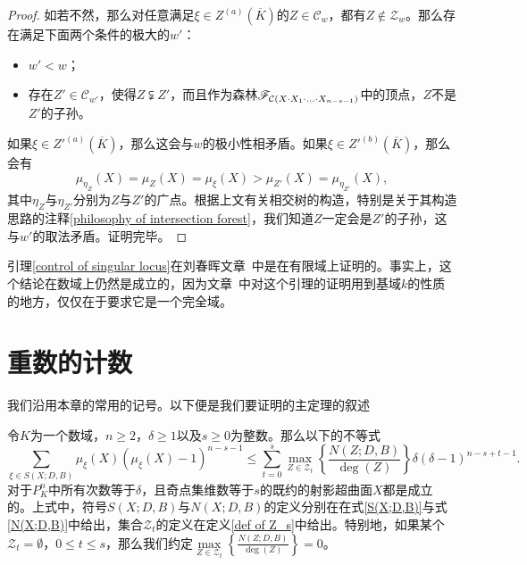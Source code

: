 \begin{proof}
如若不然，那么对任意满足$\xi\in Z^{(a)}(\overline{K})$的$Z\in \mathcal{C}_w$，都有$Z\not\in \mathcal{Z}_w$。那么存在满足下面两个条件的极大的$w'$：
\begin{itemize}
\item $w' < w$；
\item 存在$Z' \in \mathcal{C}_{w'}$，使得$Z\subsetneqq Z'$，而且作为森林$\mathscr{F}_{\mathcal C(X\cdot X_{1}\cdot\ldots\cdot X_{n-s-1})}$中的顶点，$Z$不是$Z'$的子孙。
\end{itemize}
如果$\xi\in Z'^{(a)}(\overline{K})$，那么这会与$w$的极小性相矛盾。如果$\xi\in Z'^{(b)}(\overline{K})$，那么会有
\begin{equation}
\mu_{\eta_Z}(X) = \mu_Z(X) = \mu_{\xi}(X) > \mu_{Z'}(X) = \mu_{\eta_{Z'}}(X),
\end{equation}
其中$\eta_Z$与$\eta_{Z'}$分别为$Z$与$Z'$的广点。根据上文有关相交树的构造，特别是关于其构造思路的注释\ref{philosophy of intersection forest}，我们知道$Z$一定会是$Z'$的子孙，这与$w'$的取法矛盾。证明完毕。
\end{proof}

\begin{remark}
引理\ref{control of singular locus}在刘春晖文章~中是在有限域上证明的。事实上，这个结论在数域上仍然是成立的，因为文章~中对这个引理的证明用到基域$k$的性质的地方，仅仅在于要求它是一个完全域。
\end{remark}

\section{重数的计数}
\label{counting multiplicity}
我们沿用本章的常用的记号。以下便是我们要证明的主定理的叙述

\begin{theorem} \label{main theorem}
令$K$为一个数域，$n \geqslant 2$，$\delta \geqslant 1$以及$s \geqslant 0$为整数。那么以下的不等式
\begin{equation} \label{estimate in main theorem}
\sum_{\xi\in S(X;D,B)} \mu_{\xi}(X)(\mu_{\xi}(X)-1)^{n-s-1} \leqslant \sum_{t=0}^s\max_{Z\in\mathcal Z_t}\left\{\frac{N(Z;D,B)}{\deg(Z)}\right\}\delta(\delta-1)^{n-s+t-1}.
\end{equation}
对于$P^n_K$中所有次数等于$\delta$，且奇点集维数等于$s$的既约的射影超曲面$X$都是成立的。上式中，符号$S(X;D,B)$与$N(X;D,B)$的定义分别在在式\eqref{S(X;D,B)}与式\eqref{N(X;D,B)}中给出，集合$\mathcal{Z}_t$的定义在定义\ref{def of Z_s}中给出。特别地，如果某个$\mathcal{Z}_t = \emptyset$，$0 \leqslant t \leqslant s$，那么我们约定$\max\limits_{Z\in\mathcal Z_t} \left\{ \frac{N(Z;D,B)}{\deg(Z)} \right\} = 0$。
\end{theorem}

